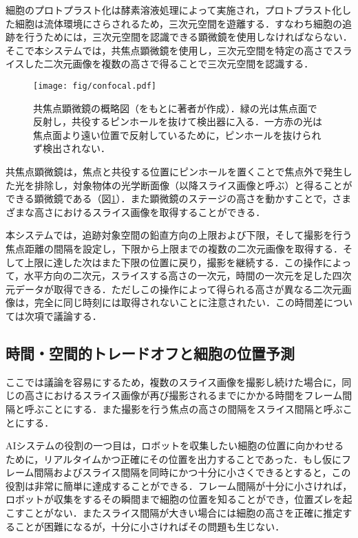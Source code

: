     細胞のプロトプラスト化は酵素溶液処理によって実施され，プロトプラスト化した細胞は流体環境にさらされるため，三次元空間を遊離する．すなわち細胞の追跡を行うためには，三次元空間を認識できる顕微鏡を使用しなければならない．そこで本システムでは，共焦点顕微鏡\cite{paddock2000principles}を使用し，三次元空間を特定の高さでスライスした二次元画像を複数の高さで得ることで三次元空間を認識する．

    \begin{figure}[t]
        \centering
        \texttt{[image: fig/confocal.pdf]}
        \caption[共焦点顕微鏡の概略図]{共焦点顕微鏡の概略図（\cite{paddock2000principles}をもとに著者が作成）．緑の光は焦点面で反射し，共役するピンホールを抜けて検出器に入る．一方赤の光は焦点面より遠い位置で反射しているために，ピンホールを抜けられず検出されない．}
        \label{fig:confocal_microscope}
    \end{figure}

    共焦点顕微鏡は，焦点と共役する位置にピンホールを置くことで焦点外で発生した光を排除し，対象物体の光学断面像（以降スライス画像と呼ぶ）と得ることができる顕微鏡である（図\ref{fig:confocal_microscope}）．また顕微鏡のステージの高さを動かすことで，さまざまな高さにおけるスライス画像を取得することができる．

    本システムでは，追跡対象空間の鉛直方向の上限および下限，そして撮影を行う焦点距離の間隔を設定し，下限から上限までの複数の二次元画像を取得する．そして上限に達した次はまた下限の位置に戻り，撮影を継続する．この操作によって，水平方向の二次元，スライスする高さの一次元，時間の一次元を足した四次元データが取得できる．ただしこの操作によって得られる高さが異なる二次元画像は，完全に同じ時刻には取得されないことに注意されたい．この時間差については次項で議論する．

    \subsection{時間・空間的トレードオフと細胞の位置予測}

    ここでは議論を容易にするため，複数のスライス画像を撮影し続けた場合に，同じの高さにおけるスライス画像が再び撮影されるまでにかかる時間をフレーム間隔と呼ぶことにする．また撮影を行う焦点の高さの間隔をスライス間隔と呼ぶことにする．

    AIシステムの役割の一つ目は，ロボットを収集したい細胞の位置に向かわせるために，リアルタイムかつ正確にその位置を出力することであった．もし仮にフレーム間隔およびスライス間隔を同時にかつ十分に小さくできるとすると，この役割は非常に簡単に達成することができる．フレーム間隔が十分に小さければ，ロボットが収集をするその瞬間まで細胞の位置を知ることができ，位置ズレを起こすことがない．またスライス間隔が大きい場合には細胞の高さを正確に推定することが困難になるが，十分に小さければその問題も生じない．

